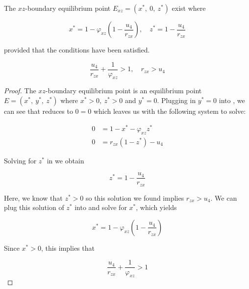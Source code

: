 \begin{theorem}\label{thm:eq-boundary-xz-exist}
    The $xz$-boundary equilibrium point $E_{xz}=\left(x^*,\ 0,\ z^*\right)$ exist where 
    
    \begin{equation*}
        x^*=1-\varphi_{xz}\left(1-\frac{u_4}{r_{zx}}\right),\quad
        z^*=1-\frac{u_4}{r_{zx}}
    \end{equation*}
    
    provided that the conditions have been satisfied.
    
    \begin{equation*}
        \frac{u_4}{r_{zx}}+\frac{1}{\varphi_{xz}} > 1,\quad 
        r_{zx}>u_4
    \end{equation*}
\end{theorem}
\begin{proof}
    The $xz$-boundary equilibrium point is an equilibrium point $E=\left(x^*,\ y^*,\ z^*\right)$ where $x^*>0,\ z^*>0$ and $y^*=0$. Plugging in $y^*=0$ into , we can see that  reduces to $0=0$ which leaves us with the following system to solve:

    \begin{subequations}\label{system:xz-boundary}
        \begin{align}
            0 &= 1-x^*-\varphi_{xz}z^* \label{eq:xz-boundary-x}\\
            0 &= r_{zx}\left(1-z^*\right)-u_4 \label{eq:xz-boundary-z}
        \end{align}
    \end{subequations}

    Solving for $z^*$ in  we obtain
    
    \begin{equation*}
        z^*=1-\frac{u_4}{r_{zx}}
    \end{equation*}
    
    Here, we know that $z^*>0$ so this solution we found implies $r_{zx}>u_4$. We can plug this solution of $z^*$ into  and solve for $x^*$, which yields 
    
    \begin{equation*}
        x^*=1-\varphi_{xz}\left(1-\frac{u_4}{r_{zx}}\right)
    \end{equation*}
    
    Since $x^*>0$, this implies that
    
    \begin{equation*}
        \frac{u_4}{r_{zx}}+\frac{1}{\varphi_{xz}} > 1
    \end{equation*}
    

\end{proof}
